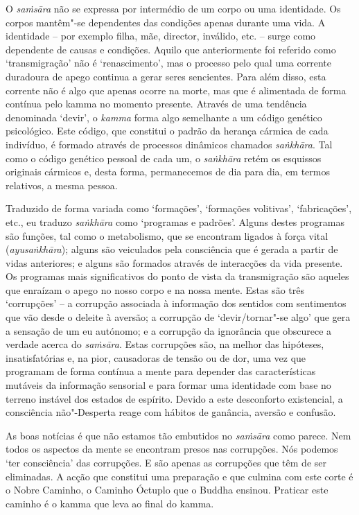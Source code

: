 O \emph{saṁsāra} não se expressa por intermédio de um corpo ou uma identidade.
Os corpos mantêm"-se dependentes das condições apenas durante uma vida. A
identidade -- por exemplo filha, mãe, director, inválido, etc. -- surge como
dependente de causas e condições. Aquilo que anteriormente foi referido como
`transmigração' não é `renascimento', mas o processo pelo qual uma corrente
duradoura de apego continua a gerar seres sencientes. Para além disso, esta
corrente não é algo que apenas ocorre na morte, mas que é alimentada de forma
contínua pelo kamma no momento presente. Através de uma tendência denominada
`devir', o \emph{kamma} forma algo semelhante a um código genético psicológico.
Este código, que constitui o padrão da herança cármica de cada indivíduo, é
formado através de processos dinâmicos chamados \emph{saṅkhāra}. Tal como o
código genético pessoal de cada um, o \emph{saṅkhāra} retém os esquissos
originais cármicos e, desta forma, permanecemos de dia para dia, em termos
relativos, a mesma pessoa.

Traduzido de forma variada como `formações', `formações volitivas',
`fabricações', etc., eu traduzo \emph{saṅkhāra} como `programas e padrões'.
Alguns destes programas são funções, tal como o metabolismo, que se encontram
ligados à força vital (\emph{ayusaṅkhāra}); alguns são veiculados pela
consciência que é gerada a partir de vidas anteriores; e alguns são formados
através de interacções da vida presente. Os programas mais significativos do
ponto de vista da transmigração são aqueles que enraízam o apego no nosso corpo
e na nossa mente. Estas são três `corrupções' -- a corrupção associada à
informação dos sentidos com sentimentos que vão desde o deleite à aversão; a
corrupção de `devir/tornar"-se algo' que gera a sensação de um eu autónomo; e a
corrupção da ignorância que obscurece a verdade acerca do \emph{saṁsāra}. Estas
corrupções são, na melhor das hipóteses, insatisfatórias e, na pior, causadoras
de tensão ou de dor, uma vez que programam de forma contínua a mente para
depender das características mutáveis da informação sensorial e para formar uma
identidade com base no terreno instável dos estados de espírito. Devido a este
desconforto existencial, a consciência não"-Desperta reage com hábitos de
ganância, aversão e confusão.

As boas notícias é que não estamos tão embutidos no \emph{saṁsāra} como parece.
Nem todos os aspectos da mente se encontram presos nas corrupções. Nós podemos
`ter consciência' das corrupções. E são apenas as corrupções que têm de ser
eliminadas. A acção que constitui uma preparação e que culmina com este corte é
o Nobre Caminho, o Caminho Óctuplo que o Buddha ensinou. Praticar este caminho é
o kamma que leva ao final do kamma.

